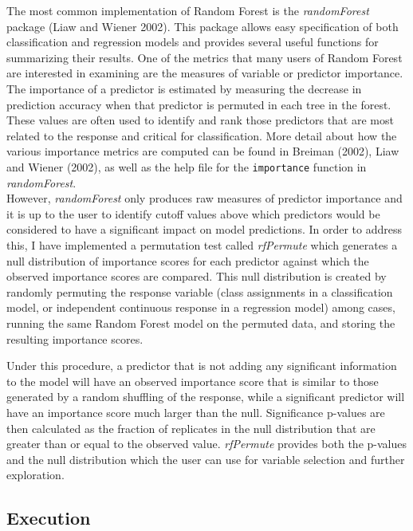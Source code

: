 \documentclass[]{article}
\begin{document}
The most common implementation of Random Forest is the
\emph{randomForest} package (Liaw and Wiener 2002). This package allows
easy specification of both classification and regression models and
provides several useful functions for summarizing their results. One of
the metrics that many users of Random Forest are interested in examining
are the measures of variable or predictor importance. The importance of
a predictor is estimated by measuring the decrease in prediction
accuracy when that predictor is permuted in each tree in the forest.
These values are often used to identify and rank those predictors that
are most related to the response and critical for classification. More
detail about how the various importance metrics are computed can be
found in Breiman (2002), Liaw and Wiener (2002), as well as the help
file for the \texttt{importance} function in \emph{randomForest}.\\
However, \emph{randomForest} only produces raw measures of predictor
importance and it is up to the user to identify cutoff values above
which predictors would be considered to have a significant impact on
model predictions. In order to address this, I have implemented a
permutation test called \emph{rfPermute} which generates a null
distribution of importance scores for each predictor against which the
observed importance scores are compared. This null distribution is
created by randomly permuting the response variable (class assignments
in a classification model, or independent continuous response in a
regression model) among cases, running the same Random Forest model on
the permuted data, and storing the resulting importance scores.

Under this procedure, a predictor that is not adding any significant
information to the model will have an observed importance score that is
similar to those generated by a random shuffling of the response, while
a significant predictor will have an importance score much larger than
the null. Significance p-values are then calculated as the fraction of
replicates in the null distribution that are greater than or equal to
the observed value. \emph{rfPermute} provides both the p-values and the
null distribution which the user can use for variable selection and
further exploration.

\subsection{Execution}\label{execution}
\end{document}
